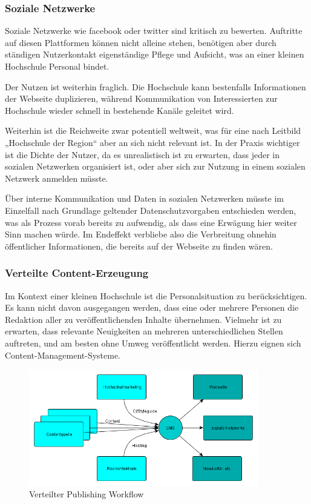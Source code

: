 \subsubsection{Soziale Netzwerke}
Soziale Netzwerke wie facebook oder twitter sind kritisch zu bewerten. Auftritte auf diesen Plattformen können nicht alleine stehen, benötigen aber durch ständigen Nutzerkontakt eigenständige Pflege und Aufsicht, was an einer kleinen Hochschule Personal bindet.

Der Nutzen ist weiterhin fraglich. Die Hochschule kann bestenfalls Informationen der Webseite duplizieren, während Kommunikation von Interessierten zur Hochschule wieder schnell in bestehende Kanäle geleitet wird.

Weiterhin ist die Reichweite zwar potentiell weltweit, was für eine nach Leitbild „Hochschule der Region“ aber an sich nicht relevant ist. In der Praxis wichtiger ist die Dichte der Nutzer, da es unrealistisch ist zu erwarten, dass jeder in sozialen Netzwerken organisiert ist, oder aber sich zur Nutzung in einem sozialen Netzwerk anmelden müsste.

Über interne Kommunikation und Daten in sozialen Netzwerken müsste im Einzelfall nach Grundlage geltender Datenschutzvorgaben entschieden werden, was als Prozess vorab bereits zu aufwendig, als dass eine Erwägung hier weiter Sinn machen würde.
Im Endeffekt verbliebe also die Verbreitung ohnehin öffentlicher Informationen, die bereits auf der Webseite zu finden wären.

\subsubsection{Verteilte Content-Erzeugung}
Im Kontext einer kleinen Hochschule ist die Personalsituation zu berücksichtigen. Es kann nicht davon ausgegangen werden, dass eine oder mehrere Personen die Redaktion aller zu veröffentlichenden Inhalte übernehmen. Vielmehr ist zu erwarten, dass relevante Neuigkeiten an mehreren unterschiedlichen Stellen auftreten, und am besten ohne Umweg veröffentlicht werden. Hierzu eignen sich Content-Management-Systeme.

\begin{figure}[h!]
	\centering
	\includegraphics[width=10cm]{kapitel/gruppe3/bilder/verteilter_publishing_workflow}
	\caption{Verteilter Publishing Workflow}
	\label{fig_publishing_workflow}
\end{figure}

